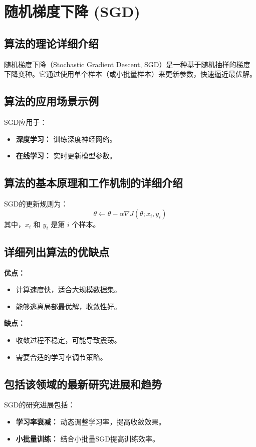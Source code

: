 \section{随机梯度下降 (SGD)}
\subsection*{算法的理论详细介绍}
随机梯度下降（Stochastic Gradient Descent, SGD）是一种基于随机抽样的梯度下降变种。它通过使用单个样本（或小批量样本）来更新参数，快速逼近最优解。

\subsection*{算法的应用场景示例}
SGD应用于：
\begin{itemize}
    \item \textbf{深度学习：} 训练深度神经网络。
    \item \textbf{在线学习：} 实时更新模型参数。
\end{itemize}

\subsection*{算法的基本原理和工作机制的详细介绍}
SGD的更新规则为：
\[
    \theta \leftarrow \theta - \alpha \nabla J(\theta; x_i, y_i)
\]
其中，\(x_i\) 和 \(y_i\) 是第 \(i\) 个样本。

\subsection*{详细列出算法的优缺点}
\textbf{优点：}
\begin{itemize}
    \item 计算速度快，适合大规模数据集。
    \item 能够逃离局部最优解，收敛性好。
\end{itemize}

\textbf{缺点：}
\begin{itemize}
    \item 收敛过程不稳定，可能导致震荡。
    \item 需要合适的学习率调节策略。
\end{itemize}

\subsection*{包括该领域的最新研究进展和趋势}
SGD的研究进展包括：
\begin{itemize}
    \item \textbf{学习率衰减：} 动态调整学习率，提高收敛效果。
    \item \textbf{小批量训练：} 结合小批量SGD提高训练效率。
\end{itemize}
